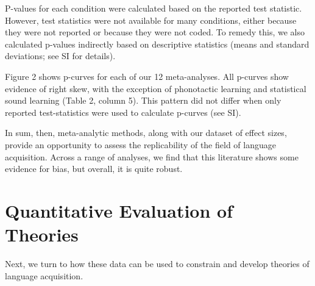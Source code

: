 \documentclass[9pt,twocolumn,twoside,lineno]{pnas-new}
\begin{document}
\begin{table}[b!]
\begin{tabular*}{8.7cm}{lrrrr}
\bottomrule
\end{tabular*}


\end{table}

P-values for each condition were calculated based on the reported test
statistic. However, test statistics were not available for many
conditions, either because they were not reported or because they were
not coded. To remedy this, we also calculated p-values indirectly based
on descriptive statistics (means and standard deviations; see SI for
details).




Figure 2 shows p-curves for each of our 12 meta-analyses. All p-curves
show evidence of right skew, with the exception of phonotactic learning
and statistical sound learning (Table 2, column 5). This pattern did not
differ when only reported test-statistics were used to calculate
p-curves (see SI).

In sum, then, meta-analytic methods, along with our dataset of effect
sizes, provide an opportunity to assess the replicability of the field
of language acquisition. Across a range of analyses, we find that this
literature shows some evidence for bias, but overall, it is quite
robust.



\section*{Quantitative Evaluation of
Theories}\label{quantitative-evaluation-of-theories}

Next, we turn to how these data can be used to constrain and develop
theories of language acquisition.
\end{document}
